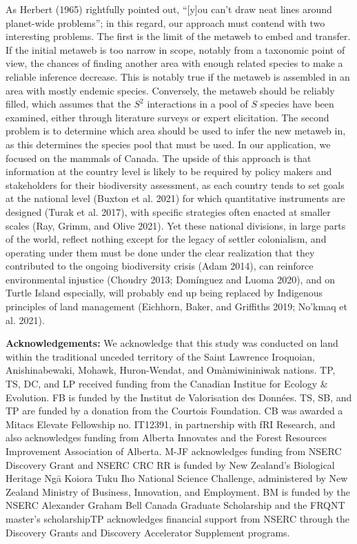 \documentclass[11pt]{article}
\begin{document}
As Herbert (1965) rightfully pointed out, ``{[}y{]}ou can't draw neat
lines around planet-wide problems''; in this regard, our approach must
contend with two interesting problems. The first is the limit of the
metaweb to embed and transfer. If the initial metaweb is too narrow in
scope, notably from a taxonomic point of view, the chances of finding
another area with enough related species to make a reliable inference
decrease. This is notably true if the metaweb is assembled in an area
with mostly endemic species. Conversely, the metaweb should be reliably
filled, which assumes that the \(S^2\) interactions in a pool of \(S\)
species have been examined, either through literature surveys or expert
elicitation. The second problem is to determine which area should be
used to infer the new metaweb in, as this determines the species pool
that must be used. In our application, we focused on the mammals of
Canada. The upside of this approach is that information at the country
level is likely to be required by policy makers and stakeholders for
their biodiversity assessment, as each country tends to set goals at the
national level (Buxton et al. 2021) for which quantitative instruments
are designed (Turak et al. 2017), with specific strategies often enacted
at smaller scales (Ray, Grimm, and Olive 2021). Yet these national
divisions, in large parts of the world, reflect nothing except for the
legacy of settler colonialism, and operating under them must be done
under the clear realization that they contributed to the ongoing
biodiversity crisis (Adam 2014), can reinforce environmental injustice
(Choudry 2013; Domínguez and Luoma 2020), and on Turtle Island
especially, will probably end up being replaced by Indigenous principles
of land management (Eichhorn, Baker, and Griffiths 2019; No'kmaq et al.
2021).

\textbf{Acknowledgements:} We acknowledge that this study was conducted
on land within the traditional unceded territory of the Saint Lawrence
Iroquoian, Anishinabewaki, Mohawk, Huron-Wendat, and Omàmiwininiwak
nations. TP, TS, DC, and LP received funding from the Canadian Institue
for Ecology \& Evolution. FB is funded by the Institut de Valorisation
des Données. TS, SB, and TP are funded by a donation from the Courtois
Foundation. CB was awarded a Mitacs Elevate Fellowship no. IT12391, in
partnership with fRI Research, and also acknowledges funding from
Alberta Innovates and the Forest Resources Improvement Association of
Alberta. M-JF acknowledges funding from NSERC Discovery Grant and NSERC
CRC RR is funded by New Zealand's Biological Heritage Ngā Koiora Tuku
Iho National Science Challenge, administered by New Zealand Ministry of
Business, Innovation, and Employment. BM is funded by the NSERC
Alexander Graham Bell Canada Graduate Scholarship and the FRQNT master's
scholarshipTP acknowledges financial support from NSERC through the
Discovery Grants and Discovery Accelerator Supplement programs.
\end{document}

